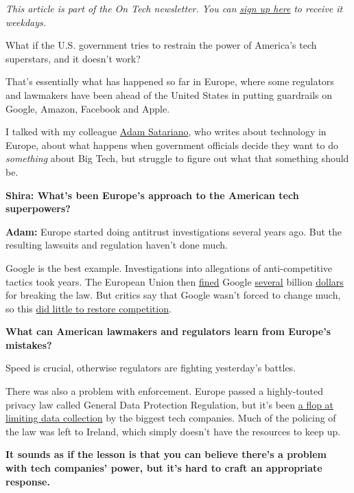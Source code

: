 \emph{This article is part of the On Tech newsletter. You can}
\href{https://www.nytimes.com/newsletters/signup/OT}{\emph{sign up
here}} \emph{to receive it weekdays.}

What if the U.S. government tries to restrain the power of America's
tech superstars, and it doesn't work?

That's essentially what has happened so far in Europe, where some
regulators and lawmakers have been ahead of the United States in putting
guardrails on Google, Amazon, Facebook and Apple.

I talked with my colleague
\href{https://www.nytimes.com/by/adam-satariano}{Adam Satariano}, who
writes about technology in Europe, about what happens when government
officials decide they want to do \emph{something} about Big Tech, but
struggle to figure out what that something should be.

\textbf{Shira: What's been Europe's approach to the American tech
superpowers?}

\textbf{Adam:} Europe started doing antitrust investigations several
years ago. But the resulting lawsuits and regulation haven't done much.

Google is the best example. Investigations into allegations of
anti-competitive tactics took years. The European Union then
\href{https://www.nytimes.com/2018/07/18/technology/google-eu-android-fine.html}{fined}
Google
\href{https://www.nytimes.com/2017/06/27/technology/eu-google-fine.html}{several}
billion
\href{https://www.nytimes.com/2019/03/20/business/google-fine-advertising.html}{dollars}
for breaking the law. But critics say that Google wasn't forced to
change much, so this
\href{https://www.nytimes.com/2019/11/11/business/europe-technology-antitrust-regulation.html}{did
little to restore competition}.

\textbf{What can American lawmakers and regulators learn from Europe's
mistakes?}

Speed is crucial, otherwise regulators are fighting yesterday's battles.

There was also a problem with enforcement. Europe passed a highly-touted
privacy law called General Data Protection Regulation, but it's been
\href{https://www.nytimes.com/2020/04/27/technology/GDPR-privacy-law-europe.html}{a
flop at limiting data collection} by the biggest tech companies. Much of
the policing of the law was left to Ireland, which simply doesn't have
the resources to keep up.

\textbf{It sounds as if the lesson is that you can believe there's a
problem with tech companies' power, but it's hard to craft an
appropriate response.}

